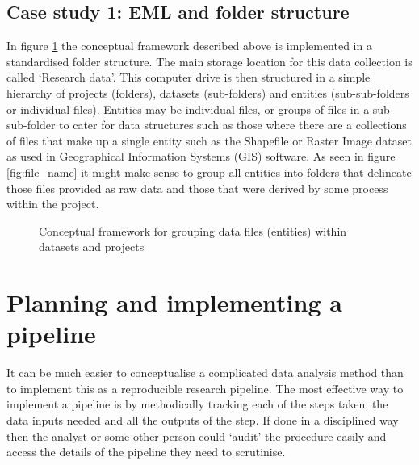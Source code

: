 \documentclass[11pt,a4paper]{article}
\begin{document}
\subsection{Case study 1: EML and folder structure}

In figure \ref{fig:M2} the conceptual framework described above is implemented in a standardised folder structure.  The main storage location for this data collection is called `Research data'.  
This computer drive is then structured in a simple hierarchy of projects (folders), datasets (sub-folders) and entities (sub-sub-folders or individual files).  Entities may be individual files, or groups of files in a sub-sub-folder to cater for data structures such as those where there are a collections of files that make up a single entity such as the Shapefile or Raster Image dataset as used in Geographical Information Systems (GIS) software.  As seen in figure \ref{fig:file_name} it might make sense to group all entities into folders that delineate those files provided as raw data and those that were derived by some process within the project.

\begin{figure}[!h]
\centering
{}
\caption{Conceptual framework for grouping data files (entities) within datasets and projects} \label{fig:M2}
\end{figure}


\section{Planning and implementing a
pipeline}\label{planning-and-implementing-a-pipeline}

It can be much easier to conceptualise a complicated data analysis
method than to implement this as a reproducible research pipeline. The
most effective way to implement a pipeline is by methodically tracking
each of the steps taken, the data inputs needed and all the outputs of
the step. If done in a disciplined way then the analyst or some other
person could `audit' the procedure easily and access the details of the
pipeline they need to scrutinise.
\end{document}
